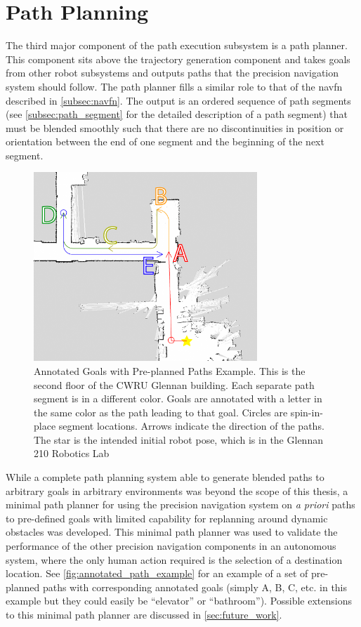 \section{Path Planning}\label{sec:path_planning}

The third major component of the path execution subsystem is a path planner. This component sits above the trajectory generation component and takes goals from other robot subsystems and outputs paths that the precision navigation system should follow. The path planner fills a similar role to that of the navfn described in \autoref{subsec:navfn}. The output is an ordered sequence of path segments (see \autoref{subsec:path_segment} for the detailed description of a path segment) that must be blended smoothly such that there are no discontinuities in position or orientation between the end of one segment and the beginning of the next segment.

\begin{figure}
\centering
\includegraphics[width=0.75\textwidth]{images/2nd_floor_one_door_cropped_annotated}
\caption[Annotated Goals with Pre-planned Paths Example]{Annotated Goals with Pre-planned Paths Example. This is the second floor of the CWRU Glennan building. Each separate path segment is in a different color. Goals are annotated with a letter in the same color as the path leading to that goal. Circles are spin-in-place segment locations. Arrows indicate the direction of the paths. The star is the intended initial robot pose, which is in the Glennan 210 Robotics Lab \label{fig:annotated_path_example}}
\end{figure}

While a complete path planning system able to generate blended paths to arbitrary goals in arbitrary environments was beyond the scope of this thesis, a minimal path planner for using the precision navigation system on \emph{a priori} paths to pre-defined goals with limited capability for replanning around dynamic obstacles was developed. This minimal path planner was used to validate the performance of the other precision navigation components in an autonomous system, where the only human action required is the selection of a destination location. See \autoref{fig:annotated_path_example} for an example of a set of pre-planned paths with corresponding annotated goals (simply A, B, C, etc. in this example but they could easily be ``elevator'' or ``bathroom''). Possible extensions to this minimal path planner are discussed in \autoref{sec:future_work}.

